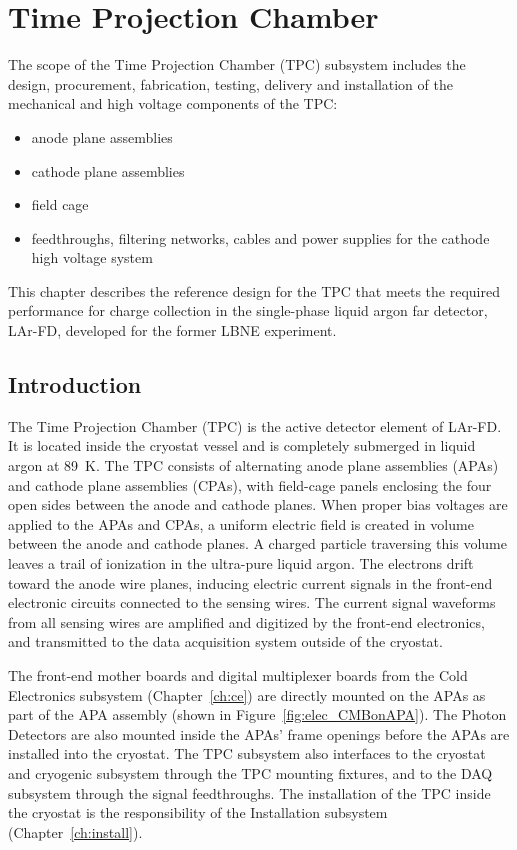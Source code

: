 \chapter{Time Projection Chamber}
\label{ch:tpc}

The scope of the Time Projection Chamber (TPC) subsystem includes the design, procurement, fabrication, testing, delivery and installation of the mechanical and high voltage components of the TPC: 
\begin{itemize}
\item anode plane assemblies 
\item cathode plane assemblies
\item field cage
\item feedthroughs, filtering networks, cables and power supplies for the cathode high voltage system
\end{itemize}
This chapter describes the reference design for the TPC that meets the required performance for charge 
collection in the single-phase liquid argon far detector, LAr-FD, developed for the former LBNE experiment.

\section{Introduction}

The Time Projection Chamber (TPC) is the active detector element of LAr-FD. It is located inside the cryostat 
vessel and is completely submerged in liquid argon at 89~K. The TPC consists of alternating anode plane 
assemblies (APAs) and cathode plane assemblies (CPAs), with field-cage panels enclosing the four open sides between the anode and cathode planes.
When proper bias voltages are applied to the APAs and CPAs, a uniform electric field is created in volume between the anode and cathode planes. A charged particle traversing this volume leaves a trail of 
ionization in the ultra-pure liquid argon.  The electrons drift toward the anode wire planes, inducing electric current signals in the front-end electronic circuits connected to the sensing wires.  The current 
signal waveforms from all sensing wires are amplified and digitized by the front-end electronics, and transmitted to the data acquisition system outside of the cryostat.

The front-end mother boards and digital multiplexer boards from the Cold Electronics subsystem (Chapter~\ref{ch:ce}) are directly mounted on the APAs as part of the APA assembly (shown in Figure~\ref{fig:elec_CMBonAPA}).  The Photon Detectors are also mounted 
inside the APAs' frame openings before the APAs are installed into the cryostat. The TPC subsystem also interfaces to the cryostat and cryogenic subsystem through the TPC mounting fixtures, and to the DAQ 
subsystem through the signal feedthroughs.  The installation of the TPC inside the cryostat is the responsibility of the Installation subsystem (Chapter~\ref{ch:install}).

